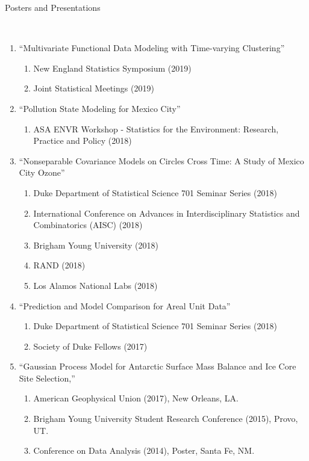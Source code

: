 \documentclass[12pt]{article}
\newcommand{\head}[1]{ %
    \bigskip %
    \begin{large}\begin{bf}{#1}\end{bf}\end{large} %

    \ \\ [-1.3cm] %

    \hrulefill}
\begin{document}
\head{Posters and Presentations}

\begin{enumerate}[label=$\bullet$]
\item ``Multivariate Functional Data Modeling with Time-varying Clustering''
\begin{enumerate}[label=$\cdot$]
\item New England Statistics Symposium (2019)
\item Joint Statistical Meetings (2019)
\end{enumerate}
\item ``Pollution State Modeling for Mexico City''
\begin{enumerate}[label=$\cdot$]
\item ASA ENVR Workshop - Statistics for the Environment: Research, Practice and Policy (2018)
\end{enumerate}
\item ``Nonseparable Covariance Models on Circles Cross Time: A Study of Mexico City Ozone''
\begin{enumerate}[label=$\cdot$]
\item Duke Department of Statistical Science 701 Seminar Series (2018)
\item International Conference on Advances in Interdisciplinary Statistics and Combinatorics (AISC) (2018)
\item Brigham Young University (2018)
\item RAND (2018)
\item Los Alamos National Labs (2018)
\end{enumerate}
\item ``Prediction and Model Comparison for Areal Unit Data''
\begin{enumerate}[label=$\cdot$]
\item Duke Department of Statistical Science 701 Seminar Series (2018)
\item Society of Duke Fellows (2017)
\end{enumerate}
\item  ``Gaussian Process Model for Antarctic Surface Mass Balance and Ice Core Site Selection,'' 
\begin{enumerate}[label=$\cdot$]
\item American Geophysical Union (2017), New Orleans, LA.
\item Brigham Young University Student Research Conference (2015),  Provo, UT.
\item Conference on Data Analysis (2014), Poster, Santa Fe, NM.

\end{enumerate}
\end{enumerate}
\end{document}
